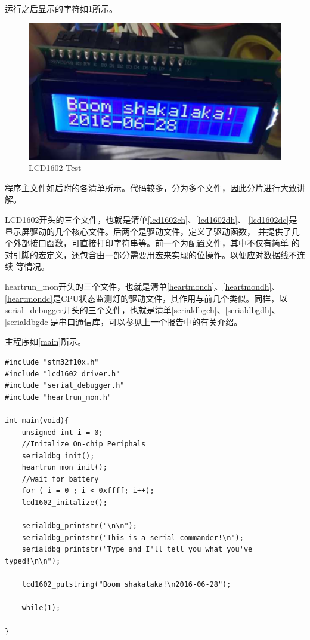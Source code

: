 \documentclass[a4paper]{ctexart}
\begin{document}
运行之后显示的字符如\ref{lcdrun}所示。
\begin{figure}[h]
  \centering\includegraphics[width=\textwidth]{./img/1602_test.png}
  \caption{LCD1602 Test}\label{lcdrun}
\end{figure}

程序主文件如后附的各清单所示。代码较多，分为多个文件，因此分片进行大致讲解。

LCD1602开头的三个文件，也就是清单\ref{lcd1602ch}、\ref{lcd1602dh}、
\ref{lcd1602dc}是显示屏驱动的几个核心文件。后两个是驱动文件，定义了驱动函数，
并提供了几个外部接口函数，可直接打印字符串等。前一个为配置文件，其中不仅有简单
的对引脚的宏定义，还包含由一部分需要用宏来实现的位操作。以便应对数据线不连续
等情况。

heartrun\_mon开头的三个文件，也就是清单\ref{heartmonch}、\ref{heartmondh}、
\ref{heartmondc}是CPU状态监测灯的驱动文件，其作用与前几个类似。同样，以
serial\_debugger开头的三个文件，也就是清单\ref{serialdbgch}、\ref{serialdbgdh}、
\ref{serialdbgdc}是串口通信库，可以参见上一个报告中的有关介绍。

主程序如\ref{main}所示。

\begin{lstlisting}[caption={Main.c},label={main}]
#include "stm32f10x.h"
#include "lcd1602_driver.h"
#include "serial_debugger.h"
#include "heartrun_mon.h"

int main(void){
	unsigned int i = 0;
	//Initalize On-chip Periphals
	serialdbg_init();
	heartrun_mon_init();
	//wait for battery
	for ( i = 0 ; i < 0xffff; i++);
	lcd1602_initalize();
	
	serialdbg_printstr("\n\n");
	serialdbg_printstr("This is a serial commander!\n");
	serialdbg_printstr("Type and I'll tell you what you've typed!\n\n");
	
	lcd1602_putstring("Boom shakalaka!\n2016-06-28");
	
	while(1);

}
\end{lstlisting}
\end{document}
